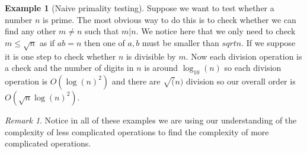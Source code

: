 \documentclass[
]{book}
\theoremstyle{definition}
\theoremstyle{definition}
\newtheorem{example}{Example}[chapter]
\theoremstyle{definition}
\theoremstyle{definition}
\theoremstyle{remark}
\newtheorem*{remark}{Remark}
\begin{document}
\begin{example}[Naive primality testing]
Suppose we want to test whether a number \(n\) is prime. The most obvious way to do this is to check whether we can find any other \(m \neq n\) such that \(m|n\). We notice here that we only need to check \(m \leq \sqrt{n}\) as if \(ab=n\) then one of \(a, b\) must be smaller than \(sqrt{n}\). If we suppose it is one step to check whether \(n\) is divisible by \(m\). Now each division operation is a check and the number of digits in \(n\) is around \(\log_{10}(n)\) so each division operation is \(O(\log(n)^2)\) and there are \(\sqrt(n)\) division so our overall order is \(O(\sqrt{n}\log(n)^2 )\).
\end{example}

\begin{remark}
Notice in all of these examples we are using our understanding of the complexity of less complicated operations to find the complexity of more complicated operations.
\end{remark}

  
\end{document}
